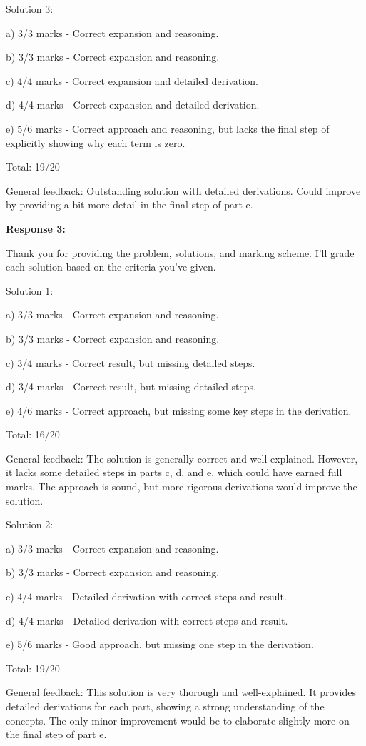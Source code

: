 \documentclass[a4paper,11pt]{article}
\begin{document}
Solution 3:

a) 3/3 marks - Correct expansion and reasoning.

b) 3/3 marks - Correct expansion and reasoning.

c) 4/4 marks - Correct expansion and detailed derivation.

d) 4/4 marks - Correct expansion and detailed derivation.

e) 5/6 marks - Correct approach and reasoning, but lacks the final step of explicitly showing why each term is zero.

Total: 19/20

General feedback: Outstanding solution with detailed derivations. Could improve by providing a bit more detail in the final step of part e.

\bigskip   
\textbf{Response 3:}

Thank you for providing the problem, solutions, and marking scheme. I'll grade each solution based on the criteria you've given.

Solution 1:

a) 3/3 marks - Correct expansion and reasoning.

b) 3/3 marks - Correct expansion and reasoning.

c) 3/4 marks - Correct result, but missing detailed steps.

d) 3/4 marks - Correct result, but missing detailed steps.

e) 4/6 marks - Correct approach, but missing some key steps in the derivation.

Total: 16/20

General feedback: The solution is generally correct and well-explained. However, it lacks some detailed steps in parts c, d, and e, which could have earned full marks. The approach is sound, but more rigorous derivations would improve the solution.

Solution 2:

a) 3/3 marks - Correct expansion and reasoning.

b) 3/3 marks - Correct expansion and reasoning.

c) 4/4 marks - Detailed derivation with correct steps and result.

d) 4/4 marks - Detailed derivation with correct steps and result.

e) 5/6 marks - Good approach, but missing one step in the derivation.

Total: 19/20

General feedback: This solution is very thorough and well-explained. It provides detailed derivations for each part, showing a strong understanding of the concepts. The only minor improvement would be to elaborate slightly more on the final step of part e.
\end{document}
